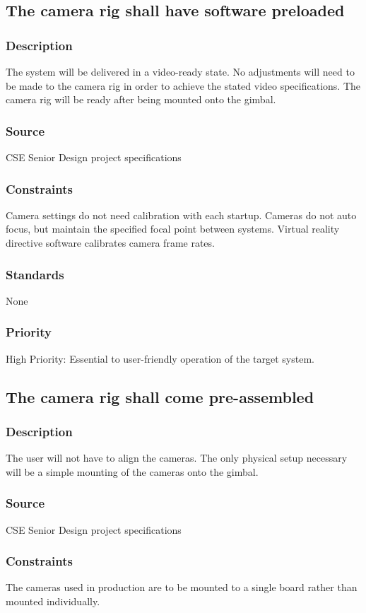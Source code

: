 
\subsection{The camera rig shall have software preloaded}
\subsubsection{Description}
The system will be delivered in a video-ready state. No adjustments will need to be made to the camera rig in order to achieve the stated video specifications. The camera rig will be ready after being mounted onto the gimbal.
\subsubsection{Source}
CSE Senior Design project specifications
\subsubsection{Constraints}
Camera settings do not need calibration with each startup. Cameras do not auto focus, but maintain the specified focal point between systems. Virtual reality directive software calibrates camera frame rates. 
\subsubsection{Standards}
None
\subsubsection{Priority}
High Priority: Essential to user-friendly operation of the target system.

\subsection{The camera rig shall come pre-assembled}
\subsubsection{Description}
The user will not have to align the cameras. The only physical setup necessary will be a simple mounting of the cameras onto the gimbal. 
\subsubsection{Source}
CSE Senior Design project specifications
\subsubsection{Constraints}
The cameras used in production are to be mounted to a single board rather than mounted individually. 
